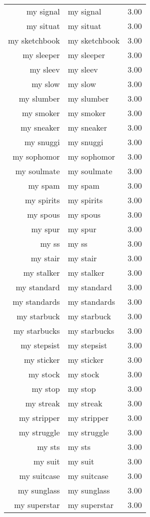 \begin{table}[ht]
\begin{tabular}{rlr}
  my signal & my signal & 3.00 \\ 
  my situat & my situat & 3.00 \\ 
  my sketchbook & my sketchbook & 3.00 \\ 
  my sleeper & my sleeper & 3.00 \\ 
  my sleev & my sleev & 3.00 \\ 
  my slow & my slow & 3.00 \\ 
  my slumber & my slumber & 3.00 \\ 
  my smoker & my smoker & 3.00 \\ 
  my sneaker & my sneaker & 3.00 \\ 
  my snuggi & my snuggi & 3.00 \\ 
  my sophomor & my sophomor & 3.00 \\ 
  my soulmate & my soulmate & 3.00 \\ 
  my spam & my spam & 3.00 \\ 
  my spirits & my spirits & 3.00 \\ 
  my spous & my spous & 3.00 \\ 
  my spur & my spur & 3.00 \\ 
  my ss & my ss & 3.00 \\ 
  my stair & my stair & 3.00 \\ 
  my stalker & my stalker & 3.00 \\ 
  my standard & my standard & 3.00 \\ 
  my standards & my standards & 3.00 \\ 
  my starbuck & my starbuck & 3.00 \\ 
  my starbucks & my starbucks & 3.00 \\ 
  my stepsist & my stepsist & 3.00 \\ 
  my sticker & my sticker & 3.00 \\ 
  my stock & my stock & 3.00 \\ 
  my stop & my stop & 3.00 \\ 
  my streak & my streak & 3.00 \\ 
  my stripper & my stripper & 3.00 \\ 
  my struggle & my struggle & 3.00 \\ 
  my sts & my sts & 3.00 \\ 
  my suit & my suit & 3.00 \\ 
  my suitcase & my suitcase & 3.00 \\ 
  my sunglass & my sunglass & 3.00 \\ 
  my superstar & my superstar & 3.00 \\ 

\end{tabular}
\end{table}
